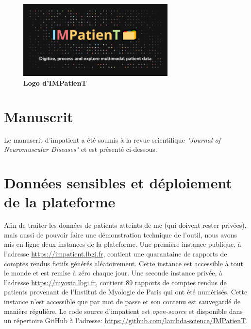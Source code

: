 \begin{figure}[H]
  \centering
  \includegraphics[width=0.7\textwidth]{figures/impatient_banner.png}
  \caption[Logo IMPatienT]{\textbf{Logo d’IMPatienT}}
  \label{fig:impatient_logo}
\end{figure}


\section{Manuscrit} 
Le manuscrit d'\gls{impatient} a été soumis à la revue scientifique \textit{"Journal of Neuromuscular Diseases"} et est présenté ci-dessous.




\section{Données sensibles et déploiement de la plateforme}
Afin de traiter les données de patients atteints de \gls{mc} (qui doivent rester privées), mais aussi de pouvoir faire une démonstration technique de l'outil, nous avons mis en ligne deux instances de la plateforme. Une première instance publique, à l'adresse \url{https://impatient.lbgi.fr}, contient une quarantaine de rapports de comptes rendus fictifs générés aléatoirement. Cette instance est accessible à tout le monde et est remise à zéro chaque jour. Une seconde instance privée, à l'adresse \url{https://myoxia.lbgi.fr}, contient 89 rapports de comptes rendus de patients provenant de l'Institut de Myologie de Paris qui ont été numérisés. Cette instance n'est accessible que par mot de passe et son contenu est sauvegardé de manière régulière. Le code source d'\gls{impatient} est \textit{open-source} et disponible dans un répertoire GitHub à l'adresse: \url{https://github.com/lambda-science/IMPatienT}.



